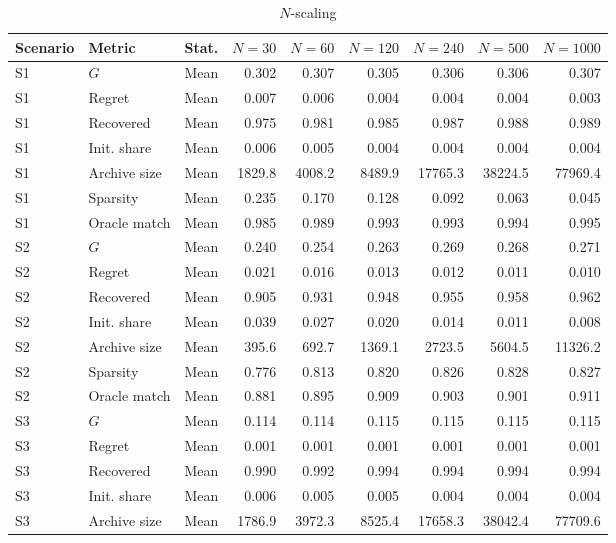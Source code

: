 \documentclass[a4paper,12pt]{article}
\newcommand{\1}{\mathbf{1}}
\begin{document}
\begin{landscape}
\begin{table}[p]
\centering
\caption{$N$-scaling}
\label{tab:ia_mc_N_scaling}
\scriptsize
\begin{adjustbox}{max width=\linewidth}
\begin{tabular}{@{}lllrrrrrr@{}}
\toprule
Scenario & Metric & Stat. & $N=30$ & $N=60$ & $N=120$ & $N=240$ & $N=500$ & $N=1000$ \\
\midrule
S1 & $G$ & Mean & 0.302 & 0.307 & 0.305 & 0.306 & 0.306 & 0.307 \\
S1 & Regret & Mean & 0.007 & 0.006 & 0.004 & 0.004 & 0.004 & 0.003 \\
S1 & Recovered & Mean & 0.975 & 0.981 & 0.985 & 0.987 & 0.988 & 0.989 \\
S1 & Init. share & Mean & 0.006 & 0.005 & 0.004 & 0.004 & 0.004 & 0.004 \\
S1 & Archive size & Mean & 1829.8 & 4008.2 & 8489.9 & 17765.3 & 38224.5 & 77969.4 \\
S1 & Sparsity & Mean & 0.235 & 0.170 & 0.128 & 0.092 & 0.063 & 0.045 \\
S1 & Oracle match & Mean & 0.985 & 0.989 & 0.993 & 0.993 & 0.994 & 0.995 \\
\midrule
S2 & $G$ & Mean & 0.240 & 0.254 & 0.263 & 0.269 & 0.268 & 0.271 \\
S2 & Regret & Mean & 0.021 & 0.016 & 0.013 & 0.012 & 0.011 & 0.010 \\
S2 & Recovered & Mean & 0.905 & 0.931 & 0.948 & 0.955 & 0.958 & 0.962 \\
S2 & Init. share & Mean & 0.039 & 0.027 & 0.020 & 0.014 & 0.011 & 0.008 \\
S2 & Archive size & Mean & 395.6 & 692.7 & 1369.1 & 2723.5 & 5604.5 & 11326.2 \\
S2 & Sparsity & Mean & 0.776 & 0.813 & 0.820 & 0.826 & 0.828 & 0.827 \\
S2 & Oracle match & Mean & 0.881 & 0.895 & 0.909 & 0.903 & 0.901 & 0.911 \\
\midrule
S3 & $G$ & Mean & 0.114 & 0.114 & 0.115 & 0.115 & 0.115 & 0.115 \\
S3 & Regret & Mean & 0.001 & 0.001 & 0.001 & 0.001 & 0.001 & 0.001 \\
S3 & Recovered & Mean & 0.990 & 0.992 & 0.994 & 0.994 & 0.994 & 0.994 \\
S3 & Init. share & Mean & 0.006 & 0.005 & 0.005 & 0.004 & 0.004 & 0.004 \\
S3 & Archive size & Mean & 1786.9 & 3972.3 & 8525.4 & 17658.3 & 38042.4 & 77709.6 \\

\end{tabular}
\end{adjustbox}
\end{table}
\end{landscape}
\end{document}
